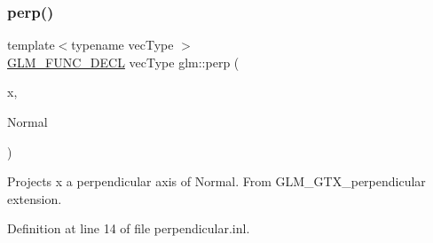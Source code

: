 \subsubsection{\texorpdfstring{perp()}{perp()}}
{\footnotesize\ttfamily template$<$typename vec\+Type $>$ \\
\hyperlink{setup_8hpp_ab2d052de21a70539923e9bcbf6e83a51}{G\+L\+M\+\_\+\+F\+U\+N\+C\+\_\+\+D\+E\+CL} vec\+Type glm\+::perp (\begin{DoxyParamCaption}\item[{vec\+Type const \&}]{x,  }\item[{vec\+Type const \&}]{Normal }\end{DoxyParamCaption})}

Projects x a perpendicular axis of Normal. From G\+L\+M\+\_\+\+G\+T\+X\+\_\+perpendicular extension. 

Definition at line 14 of file perpendicular.\+inl.

